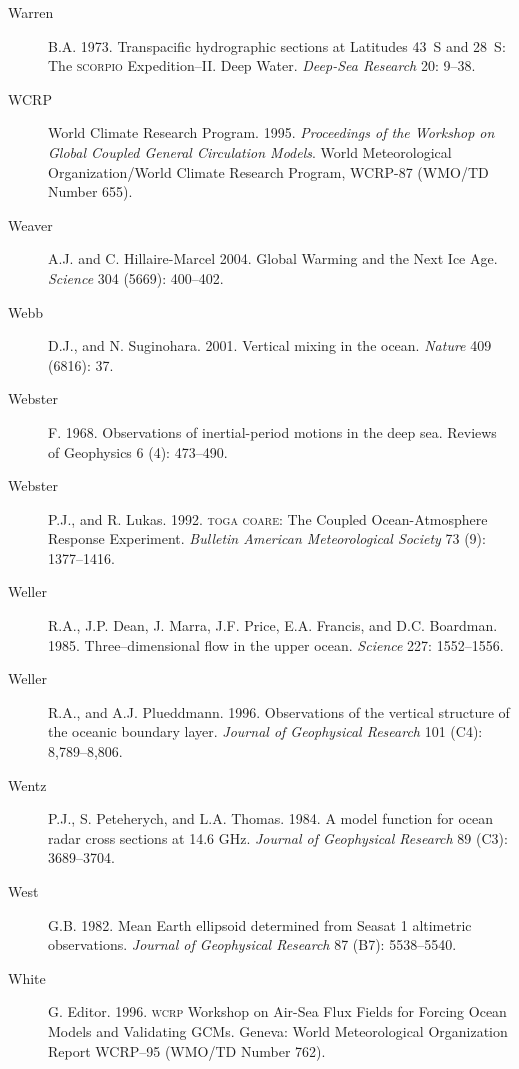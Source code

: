 \begin{description}
\item [Warren]B.A. 1973. Transpacific hydrographic sections at
  Latitudes 43\degrees\ S and 28\degrees\ S: The \textsc{scorpio}
  Expedition--II. Deep Water. \textit{Deep-Sea Research} 20: 9--38.

\item [WCRP]World Climate Research Program. 1995. \textit{Proceedings
  of the Workshop on Global Coupled General Circulation Models}. World
  Meteorological Organization/World Climate Research Program, WCRP-87
  (WMO/TD Number 655).

\item [Weaver]A.J. and C. Hillaire-Marcel 2004. Global Warming and the
  Next Ice Age. \textit{Science} 304 (5669): 400--402.

\item [Webb]D.J., and N. Suginohara. 2001. Vertical mixing in the
  ocean.  \textit{Nature} 409 (6816): 37.

\item [Webster]F. 1968. Observations of inertial-period motions in the
  deep sea. Reviews of Geophysics 6 (4): 473--490.

\item [Webster]P.J., and R. Lukas. 1992. \textsc{toga coare}: The
  Coupled Ocean-Atmosphere Response Experiment. \textit{Bulletin
    American Meteorological Society} 73 (9): 1377--1416.

\item [Weller]R.A., J.P. Dean, J. Marra, J.F. Price, E.A. Francis, and
  D.C.  Boardman. 1985. Three--dimensional flow in the upper
  ocean. \textit{Science} 227: 1552--1556.

\item [Weller]R.A., and A.J. Plueddmann. 1996. Observations of the
  vertical structure of the oceanic boundary layer. \textit{Journal of
    Geophysical Research} 101 (C4): 8,789--8,806.

\item [Wentz]P.J., S. Peteherych, and L.A. Thomas. 1984. A model
  function for ocean radar cross sections at 14.6 GHz. \textit{Journal
    of Geophysical Research} 89 (C3): 3689--3704.

\item [West]G.B. 1982. Mean Earth ellipsoid determined from Seasat 1
  altimetric observations. \textit{Journal of Geophysical Research} 87
  (B7): 5538--5540.

\item [White]G. Editor. 1996. \textsc{wcrp} Workshop on Air-Sea Flux
  Fields for Forcing Ocean Models and Validating GCMs. Geneva: World
  Meteorological Organization Report WCRP--95 (WMO/TD Number 762).


\end{description}

